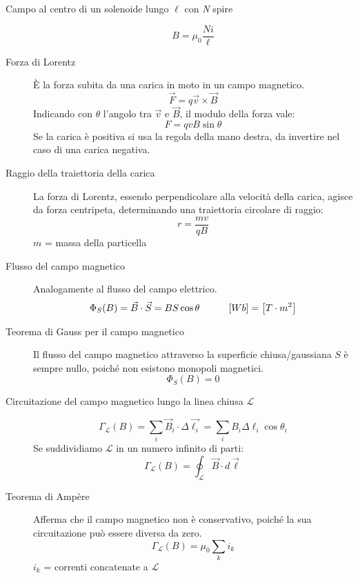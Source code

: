 \documentclass[a4paper,11pt,italian]{article}
\begin{document}
\begin{description}
  \item[Campo al centro di un solenoide lungo $ \ell $ con \textit{N} spire]
  \[ B = \mu_0 \frac{Ni}{\ell}\]
  
  \item[Forza di Lorentz] 
  È la forza subita da una carica in moto in un campo magnetico.
  \[ \vec{F} = q \vec{v} \times \vec{B} \]
  Indicando con $ \theta $ l'angolo tra $ \vec{v} $ e $ \vec{B} $, il modulo della forza vale:
  \[ F = qvB\sin \theta \]
  Se la carica è positiva si usa la regola della mano destra, da invertire nel caso di una carica negativa.
  
  \item[Raggio della traiettoria della carica] 
  La forza di Lorentz, essendo perpendicolare alla velocità della carica, agisce da forza centripeta, determinando una traiettoria circolare di raggio:
  \[ r = \frac{mv}{qB} \]
  $ m $ = massa della particella

  
  \item[Flusso del campo magnetico] 
  Analogamente al flusso del campo elettrico.
  \[ \Phi_S(B) = \vec{B} \cdot \vec{S} = B S \cos \theta \hspace*{3em} [Wb] = \left[ T \cdot m^2 \right] \]
  
  \item[Teorema di Gauss per il campo magnetico] 
  Il flusso del campo magnetico attraverso la superficie chiusa/gaussiana $ S $ è sempre nullo, poiché non esistono monopoli magnetici.
  \[ \Phi_S(B) = 0 \]
  
  \item[Circuitazione del campo magnetico lungo la linea chiusa $ \mathscr{L} $]
  \[ \Gamma_\mathscr{L}(B) = \sum_i \vec{B}_i \cdot \Delta\vec{\ell_i} = \sum_i B_i \Delta \ell_i \cos \theta_i \]
  Se suddividiamo $ \mathscr{L} $ in un numero infinito di parti:
  \[ \Gamma_\mathscr{L}(B) = \oint_\mathscr{L} \vec{B} \cdot d\vec{\ell} \]
  
  \item[Teorema di Ampère] 
  Afferma che il campo magnetico non è conservativo, poiché la sua circuitazione può essere diversa da zero.
  \[ \Gamma_\mathscr{L}(B) = \mu_0 \sum_k i_k \]
  $ i_k $ = correnti concatenate a $ \mathscr{L} $
\end{description}
\end{document}
